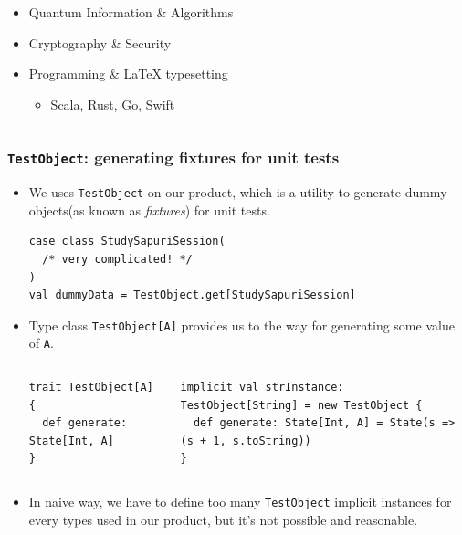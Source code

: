 \begin{frame}
\begin{columns}
\begin{column}{0.7\textwidth}
\begin{itemize}
        \item Quantum Information \& Algorithms

        \item Cryptography \& Security
        
        \item Programming \& {\LaTeX} typesetting
        \begin{itemize}
          \item Scala, Rust, Go, Swift
        \end{itemize}
      \end{itemize}
    \end{column}
  \end{columns}
\end{frame}

\begin{frame}[fragile]
  \frametitle{\lstinline|TestObject|: generating fixtures for unit tests}

  \begin{itemize}
    \item We uses \lstinline|TestObject| on our product,
    which is a utility to generate dummy objects(as known as \emph{fixtures}) for unit tests.
\begin{lstlisting}[style=scala]
case class StudySapuriSession(
  /* very complicated! */
)
val dummyData = TestObject.get[StudySapuriSession]
\end{lstlisting}

    \item Type class \lstinline|TestObject[A]| provides us to the way for generating some value of \lstinline|A|.
    \begin{columns}
      \begin{column}{0.32\textwidth}
\begin{lstlisting}[style=scala]
trait TestObject[A] {
  def generate: State[Int, A]
}
\end{lstlisting}
      \end{column}
      \begin{column}{0.68\textwidth}
\begin{lstlisting}[style=scala]
implicit val strInstance: TestObject[String] = new TestObject {
  def generate: State[Int, A] = State(s => (s + 1, s.toString))
}
\end{lstlisting}
      \end{column}
    \end{columns}

    \item In naive way, we have to define too many \lstinline|TestObject| implicit instances for
    every types used in our product, but it's not possible and reasonable.
  \end{itemize}


\end{frame}
